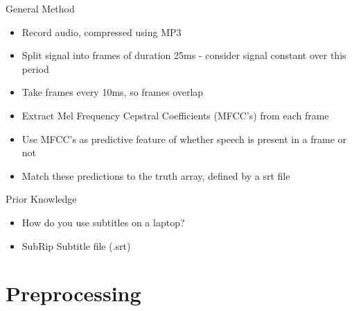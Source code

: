 \documentclass[notes]{beamer}
\begin{document}

\begin{frame}{General Method}
\begin{itemize}
	\item Record audio, compressed using MP3
	\item Split signal into frames of duration 25ms - consider signal constant over this period
	\item Take frames every 10ms, so frames overlap
	\item Extract Mel Frequency Cepstral Coefficients (MFCC's) from each frame
	\item Use MFCC's as predictive feature of whether speech is present in a frame or not
	\item Match these predictions to the truth array, defined by a srt file
\end{itemize}
\end{frame}


\begin{frame}{Prior Knowledge}
\begin{itemize}
  \item How do you use subtitles on a laptop?
  \item SubRip Subtitle file (.srt)
\end{itemize}
\end{frame}


\section{Preprocessing}
\end{document}
